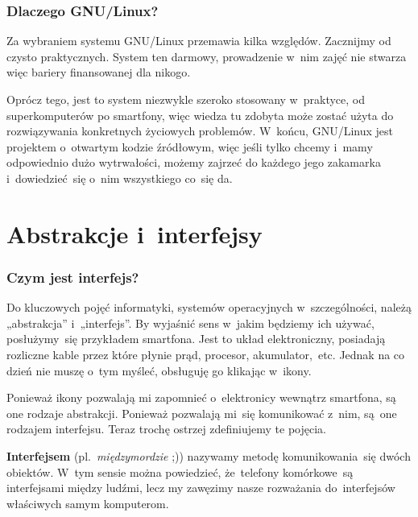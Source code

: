 \documentclass[10pt,t]{beamer}
\begin{document}
\begin{frame}
  \frametitle{Dlaczego GNU/Linux?}


  Za wybraniem systemu GNU/Linux przemawia kilka względów. Zacznijmy od
  czysto praktycznych. System ten darmowy, prowadzenie w~nim zajęć nie
  stwarza więc bariery finansowanej dla nikogo.

  Oprócz tego, jest to system niezwykle szeroko stosowany w~praktyce, od
  superkomputerów po smartfony, więc wiedza tu zdobyta może zostać użyta
  do rozwiązywania konkretnych życiowych problemów. W~końcu, GNU/Linux
  jest projektem o~otwartym kodzie źródłowym, więc jeśli tylko chcemy
  i~mamy odpowiednio dużo wytrwałości, możemy zajrzeć do każdego jego
  zakamarka i~dowiedzieć~się o~nim wszystkiego co~się da.

\end{frame}









\section{Abstrakcje i~interfejsy}


\begin{frame}
  \frametitle{Czym jest interfejs?}


  Do kluczowych pojęć informatyki, systemów operacyjnych w~szczególności,
  należą „abstrakcja” i~„interfejs”. By wyjaśnić sens w~jakim będziemy ich
  używać, posłużymy~się przykładem smartfona. Jest to układ elektroniczny,
  posiadają rozliczne kable przez które płynie prąd, procesor,
  akumulator,~etc. Jednak na co dzień nie muszę o~tym myśleć, obsługuję go
  klikając w~ikony.

  Ponieważ ikony pozwalają mi zapomnieć o~elektronicy wewnątrz smartfona,
  są one rodzaje abstrakcji. Ponieważ pozwalają mi~się komunikować z~nim,
  są~one rodzajem interfejsu. Teraz trochę ostrzej zdefiniujemy te pojęcia.

  \textbf{Interfejsem} (pl.~\textit{międzymordzie} ;)) nazywamy metodę
  komunikowania~się dwóch obiektów. W~tym sensie można powiedzieć,
  że~telefony komórkowe~są interfejsami między ludźmi, lecz my zawęzimy
  nasze rozważania do~interfejsów właściwych samym komputerom.

\end{frame}
\end{document}
